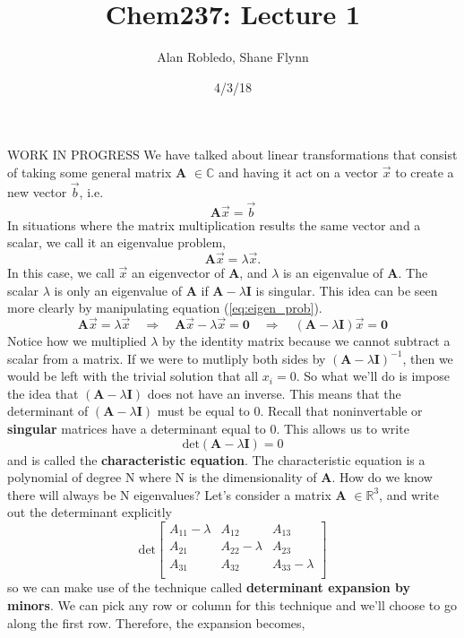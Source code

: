 \documentclass{article}
\title{Chem237: Lecture 1}
\date{4/3/18}
\author{Alan Robledo, Shane Flynn}
\newcommand{\be}{\begin{equation}}
\newcommand{\ee}{\end{equation}}
\begin{document}
\maketitle
WORK IN PROGRESS 
We have talked about linear transformations that consist of taking some general matrix \textbf{A} $\in \mathbb{C}$ and having it act on a vector $\vec{x}$ to create a new vector $\vec{b}$, i.e.
\be
  \textbf{A} \vec{x} = \vec{b}
\ee
In situations where the matrix multiplication results the same vector and a scalar, we call it an eigenvalue problem,
\be \label{eq:eigen_prob}
  \textbf{A} \vec{x} = \lambda \vec{x} .
\ee
In this case, we call $\vec{x}$ an eigenvector of \textbf{A}, and $\lambda$ is an eigenvalue of \textbf{A}.
The scalar $\lambda$ is only an eigenvalue of \textbf{A} if $\textbf{A} - \lambda \textbf{I}$ is singular.
This idea can be seen more clearly by manipulating equation (\ref{eq:eigen_prob}).
\be
  \textbf{A} \vec{x} = \lambda \vec{x} \quad \Longrightarrow \quad \textbf{A} \vec{x} - \lambda \vec{x} = \textbf{0} \quad \Longrightarrow \quad (\textbf{A} - \lambda \textbf{I})\vec{x} = \textbf{0}
\ee
Notice how we multiplied $\lambda$ by the identity matrix because we cannot subtract a scalar from a matrix.
If we were to mutliply both sides by $(\textbf{A} - \lambda \textbf{I})^{-1}$, then we would be left with the trivial solution that all $x_i = 0$.
So what we'll do is impose the idea that $(\textbf{A} - \lambda \textbf{I})$ does not have an inverse.
This means that the determinant of $(\textbf{A} - \lambda \textbf{I})$ must be equal to 0.
Recall that noninvertable or \textbf{singular} matrices have a determinant equal to 0.
This allows us to write
\be
  \text{det}(\textbf{A} - \lambda \textbf{I}) = 0
\ee
and is called the \textbf{characteristic equation}.
The characteristic equation is a polynomial of degree N where N is the dimensionality of \textbf{A}.
How do we know there will always be N eigenvalues?
Let's consider a matrix \textbf{A} $\in \mathbb{R}^3$, and write out the determinant explicitly
\be
  \text{det}
  \begin{bmatrix}
    A_{11} - \lambda  & A_{12} & A_{13} \\
    A_{21} & A_{22} - \lambda & A_{23} \\
    A_{31} & A_{32} & A_{33} - \lambda \\
  \end{bmatrix}
\ee
so we can make use of the technique called \textbf{determinant expansion by minors}.
We can pick any row or column for this technique and we'll choose to go along the first row.
Therefore, the expansion becomes,
\end{document}

